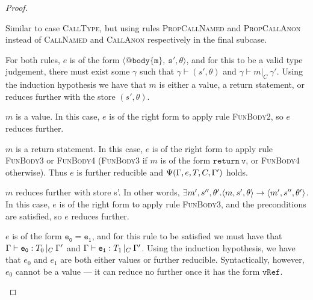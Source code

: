 \documentclass[a4paper]{article}
\theoremstyle{definition}
\theoremstyle{dotless}
\begin{document}
\begin{proof}
\begin{case}[PropCallType]
	Similar to case \textsc{CallType}, but using rules \textsc{PropCallNamed}
	and \textsc{PropCallAnon} instead of \textsc{CallNamed} and
	\textsc{CallAnon} respectively in the final subcase.

  \end{case}

  \begin{case}\label{bodytype}

	For both rules, $e$ is of the form $\mathtt{\langle @body\{m\},\ s', \theta\rangle}$, and for this
	to be a valid type judgement, there must exist some $\gamma$ such that
	$\gamma \vdash(s', \theta)$ and $\gamma\vdash m |_C\ \gamma'$.
	Using the induction hypothesis we have that $m$ is either
	a value, a return statement, or reduces further with the store $(s', \theta)$.

	\begin{subcase}
	  $m$ is a value.
	  In this case, $e$ is of the right form to apply rule \textsc{FunBody2},
	  so $e$ reduces further. 
	\end{subcase}

	\begin{subcase}
	  $m$ is a return statement.
	  In this case, $e$ is of the right form to apply rule \textsc{FunBody3} or
	  \textsc{FunBody4} (\textsc{FunBody3} if $m$ is of the form
	  $\mathtt{return\ v}$, or \textsc{FunBody4} otherwise). Thus $e$ is
	  further reducible and $\Psi(\Gamma, e, T, C, \Gamma')$ holds.
	\end{subcase}

	\begin{subcase}
	  $m$ reduces further with store s'.
	  In other words, $\exists m', s'', \theta'. \langle{}m,s',\theta\rangle{}\rightarrow{}\langle{}m',s'',\theta'\rangle$.
	  In this case, $e$ is of the right form to apply rule \textsc{FunBody3},
	  and the preconditions are satisfied, so $e$ reduces further. 
	\end{subcase}

  \end{case}

  \begin{case}[AssignType]\label{assigntype}

	$e$ is of the form $\mathtt{e_0 = e_1}$, and for this rule to be satisfied
	we must have that $\Gamma{}\vdash\mathtt{e_0}: T_0\,|_C\:\Gamma'$ and $\Gamma{}\vdash\mathtt{e_1}: T_1\,|_C\:\Gamma'$. Using the
	induction hypothesis, we have that $e_0$ and $e_1$ are both either values
	or further reducible. Syntactically, however, $e_0$ cannot be a value ---
	it can reduce no further once it has the form $\mathtt{vRef}$.


\end{case}
\end{proof}
\end{document}
